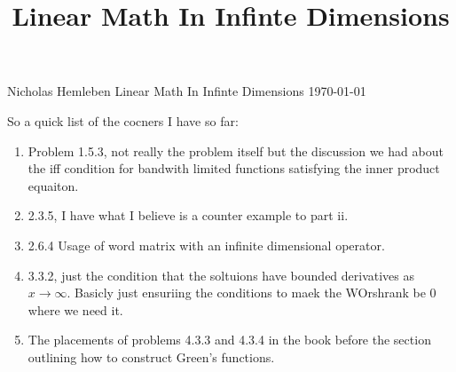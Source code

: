 \documentclass[12pt]{article}
\newcommand{\rw}{\rightarrow}
\theoremstyle{definition}
\begin{document}
\title{Linear Math In Infinte Dimensions}
{\Large Nicholas Hemleben} \hfill
{\large Linear Math In Infinte Dimensions}  
\hfill  \today


So a quick list of the cocners I have so far:
\begin{enumerate}
	\item Problem 1.5.3, not really the problem itself but the discussion we had about the iff condition for bandwith limited functions satisfying the inner product equaiton.
	\item
		2.3.5, I have what I believe is a counter example to part ii.

	\item
		2.6.4  Usage of word matrix with an infinite dimensional operator.\\
	\item
		3.3.2, just the condition that the soltuions have bounded derivatives as $x \rw \infty$. Basicly just ensuriing the conditions to maek the WOrshrank be 0 where we need it.

	\item
		The placements of problems 4.3.3 and 4.3.4 in the book before the section outlining how to construct Green's functions.

\end{enumerate}
\end{document}
